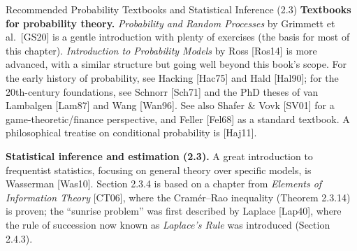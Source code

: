 \documentclass[aspectratio=169,10pt]{beamer}
\begin{document}
\begin{frame}{Recommended Probability Textbooks and Statistical Inference (2.3)}
  \textbf{Textbooks for probability theory.} \emph{Probability and Random
  Processes} by Grimmett et al.\ [GS20] is a gentle introduction with
  plenty of exercises (the basis for most of this chapter). \emph{Introduction
  to Probability Models} by Ross [Ros14] is more advanced, with a similar
  structure but going well beyond this book's scope. For the early history
  of probability, see Hacking [Hac75] and Hald [Hal90]; for the 20th-century
  foundations, see Schnorr [Sch71] and the PhD theses of van Lambalgen
  [Lam87] and Wang [Wan96]. See also Shafer \& Vovk [SV01] for a
  game-theoretic/finance perspective, and Feller [Fel68] as a standard
  textbook. A philosophical treatise on conditional probability is [Haj11].

  \textbf{Statistical inference and estimation (2.3).} A great introduction
  to frequentist statistics, focusing on general theory over specific
  models, is Wasserman [Was10]. Section 2.3.4 is based on a chapter from
  \emph{Elements of Information Theory} [CT06], where the Cramér--Rao
  inequality (Theorem 2.3.14) is proven; the ``sunrise problem'' was first
  described by Laplace [Lap40], where the rule of succession now known as
  \emph{Laplace's Rule} was introduced (Section 2.4.3).
\end{frame}
\end{document}
